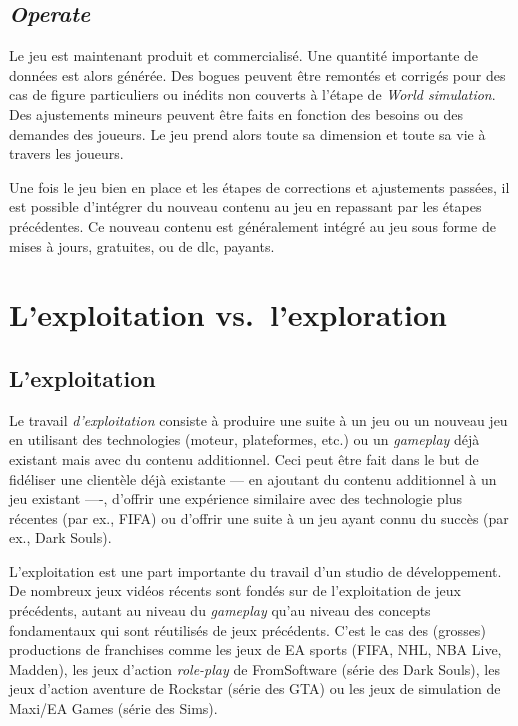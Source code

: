 \subsection{\emph{Operate}}
Le jeu est maintenant produit et commercialisé.
Une quantité importante de données est alors générée.
Des bogues peuvent être remontés et corrigés pour des cas de figure particuliers ou inédits non couverts \`a l'étape de \emph{World simulation}.
Des ajustements mineurs peuvent être faits en fonction des besoins ou des demandes des joueurs.
Le jeu prend alors toute sa dimension et toute sa vie à travers les joueurs.

Une fois le jeu bien en place et les étapes de corrections et ajustements passées, il est possible d'intégrer du nouveau contenu au jeu en repassant par les étapes précédentes.
Ce nouveau contenu est généralement intégré au jeu sous forme de mises à jours, gratuites, ou de \gls{dlc}, payants.



\section{L'exploitation vs.\ l'exploration}
\subsection{L'exploitation}
Le travail \emph{d'exploitation} consiste à produire une suite à un jeu ou un nouveau jeu en utilisant des technologies (moteur, plateformes, etc.) ou un \emph{gameplay} déjà existant mais avec du contenu additionnel.
Ceci peut être fait dans le but de fidéliser une clientèle déjà existante --- en ajoutant du contenu additionnel à un jeu existant ----, d'offrir une expérience similaire avec des technologie plus récentes (par ex., FIFA) ou d'offrir une suite à un jeu ayant connu du succès (par ex., Dark Souls).

L'exploitation est une part importante du travail d'un studio de développement.
De nombreux jeux vidéos récents sont fondés sur de l'exploitation de jeux précédents, autant au niveau du \emph{gameplay} qu'au niveau des concepts fondamentaux qui sont r\'eutilis\'es de jeux précédents.
C'est le cas des (grosses) productions de franchises comme les jeux de EA sports (FIFA, NHL, NBA Live, Madden), les jeux d'action \emph{role-play} de FromSoftware (série des Dark Souls), les jeux d'action aventure de Rockstar (série des GTA) ou les jeux de simulation de Maxi/EA Games (série des Sims). 

